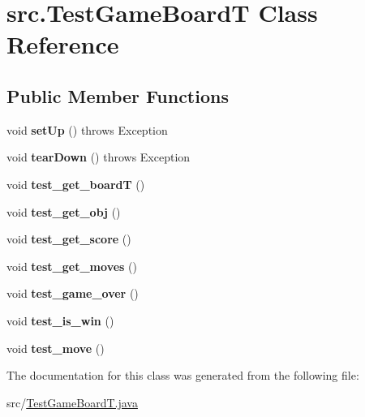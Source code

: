 \hypertarget{classsrc_1_1TestGameBoardT}{}\section{src.\+Test\+Game\+BoardT Class Reference}
\label{classsrc_1_1TestGameBoardT}
\subsection*{Public Member Functions}
\begin{DoxyCompactItemize}
\item 
\mbox{\label{classsrc_1_1TestGameBoardT_a6efbef3d9238360c9f6ea3040d4df9b5}} 
void {\bfseries set\+Up} ()  throws Exception
\item 
\mbox{\label{classsrc_1_1TestGameBoardT_aba45f57513da1768d0003094343a0941}} 
void {\bfseries tear\+Down} ()  throws Exception 
\item 
\mbox{\label{classsrc_1_1TestGameBoardT_a94f164946869b651f4015acbc5a50e90}} 
void {\bfseries test\+\_\+get\+\_\+boardT} ()
\item 
\mbox{\label{classsrc_1_1TestGameBoardT_ab9baee036660f11eafbab09307d0c57e}} 
void {\bfseries test\+\_\+get\+\_\+obj} ()
\item 
\mbox{\label{classsrc_1_1TestGameBoardT_acb8005116ee1fd010432cecdf1793e61}} 
void {\bfseries test\+\_\+get\+\_\+score} ()
\item 
\mbox{\label{classsrc_1_1TestGameBoardT_ac50d2f9391319768da208e1edd13bba9}} 
void {\bfseries test\+\_\+get\+\_\+moves} ()
\item 
\mbox{\label{classsrc_1_1TestGameBoardT_aeb91b82380b20a5abcf40f6abe1ec478}} 
void {\bfseries test\+\_\+game\+\_\+over} ()
\item 
\mbox{\label{classsrc_1_1TestGameBoardT_ace89269a5f9bf96899525874c09f46bb}} 
void {\bfseries test\+\_\+is\+\_\+win} ()
\item 
\mbox{\label{classsrc_1_1TestGameBoardT_a8a6970b8b6cee8d8e813ade8642443bc}} 
void {\bfseries test\+\_\+move} ()
\end{DoxyCompactItemize}


The documentation for this class was generated from the following file\+:\begin{DoxyCompactItemize}
\item 
src/\hyperlink{TestGameBoardT_8java}{Test\+Game\+Board\+T.\+java}\end{DoxyCompactItemize}
